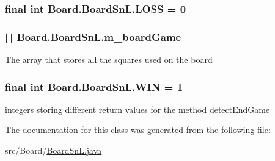 \subsubsection[{L\+O\+S\+S}]{\setlength{\rightskip}{0pt plus 5cm}final int Board.\+Board\+Sn\+L.\+L\+O\+S\+S = 0\hspace{0.3cm}{\ttfamily [private]}}\label{class_board_1_1_board_sn_l_aa6138411eddcd92ae999cff9fc34acb7}
\hypertarget{class_board_1_1_board_sn_l_a98423adeb63e796de2d496689b4ce8e1}{}
\subsubsection[{m\+\_\+board\+Game}]{ \mbox{[}$\,$\mbox{]} Board.\+Board\+Sn\+L.\+m\+\_\+board\+Game\hspace{0.3cm}{\ttfamily [private]}}\label{class_board_1_1_board_sn_l_a98423adeb63e796de2d496689b4ce8e1}
The array that stores all the squares used on the board \hypertarget{class_board_1_1_board_sn_l_a9f3b27889e40b337a28438224a5fab4b}{}
\subsubsection[{W\+I\+N}]{\setlength{\rightskip}{0pt plus 5cm}final int Board.\+Board\+Sn\+L.\+W\+I\+N = 1\hspace{0.3cm}{\ttfamily [private]}}\label{class_board_1_1_board_sn_l_a9f3b27889e40b337a28438224a5fab4b}
integers storing different return values for the method detect\+End\+Game 

The documentation for this class was generated from the following file\+:\begin{DoxyCompactItemize}
\item 
src/\+Board/\hyperlink{_board_sn_l_8java}{Board\+Sn\+L.\+java}\end{DoxyCompactItemize}
